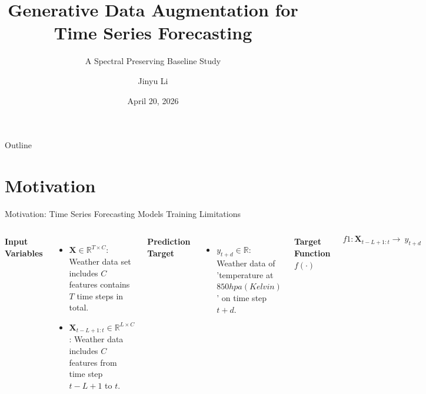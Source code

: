 \documentclass[aspectratio=169,10pt]{beamer}
\title[Generative Data Augmentation for Time Series Forecasting]{%
  Generative Data Augmentation for\\
 Time Series Forecasting}
\subtitle{A Spectral Preserving Baseline Study}
\author[Jinyu Li]{Jinyu Li}
\institute[Your Lab]{University College London}
\date[Apr 2026]{April 20, 2026}
\begin{document}

\begin{frame}
  \titlepage
\end{frame}

\begin{frame}{Outline}
  \tableofcontents
\end{frame}

\section{Motivation}

\begin{frame}{Motivation: Time Series Forecasting Models Training Limitations}
  \begin{columns}[T]
      \textbf{Input Variables}
      \begin{itemize}
        \item $\mathbf{X}\!\in\!\mathbb{R}^{T\times C}$: Weather data set includes $C$ features contains $T$ time steps in total.
        \item $\mathbf{X}_{t-L+1 : t}\!\in\!\mathbb{R}^{L \times C }$: Weather data includes $C$ features from time step $t-L+1$ to $t$. 
      \end{itemize}
      \textbf{Prediction Target}
      \begin{itemize}
        \item $y_{t+d}\!\in\!\mathbb{R}$: Weather data of 'temperature at $850 hpa(Kelvin)$' on time step $t+d$.
      \end{itemize}
      \textbf{Target Function $f(\cdot)$}
      \begin{itemize}
        \[
        f1:\mathbf{X}_{t-L+1 : t}  \rightarrow\ y_{t+d}
        \]
      \end{itemize}
      


\end{columns}
\end{frame}
\end{document}
